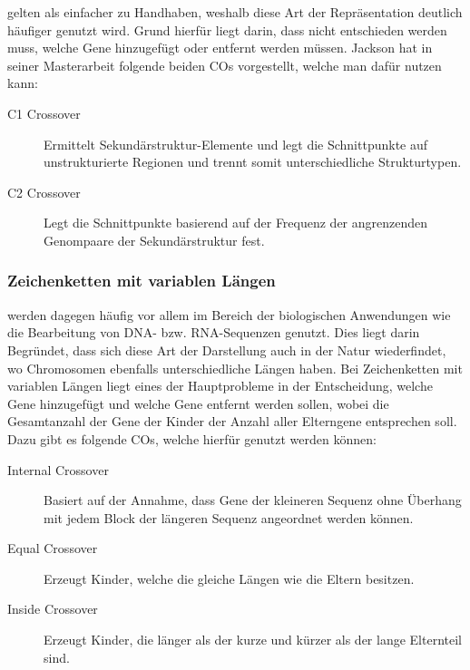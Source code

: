 		gelten als einfacher zu Handhaben, weshalb diese Art der Repräsentation deutlich häufiger genutzt wird. Grund hierfür liegt darin, dass nicht entschieden werden muss, welche Gene hinzugefügt oder entfernt werden müssen. Jackson hat in seiner Masterarbeit \cite{COProteins} folgende beiden COs vorgestellt, welche man dafür nutzen kann:
		
		\begin{description}
			\item[C1 Crossover] Ermittelt Sekundärstruktur-Elemente und legt die Schnittpunkte auf unstrukturierte Regionen und trennt somit unterschiedliche Strukturtypen.
			\item[C2 Crossover] Legt die Schnittpunkte basierend auf der Frequenz der angrenzenden Genompaare der Sekundärstruktur fest.
		\end{description}
	
	\subsubsection{Zeichenketten mit variablen Längen}
	
		werden dagegen häufig vor allem im Bereich der biologischen Anwendungen wie die Bearbeitung von DNA- bzw. RNA-Sequenzen genutzt. Dies liegt darin Begründet, dass sich diese Art der Darstellung auch in der Natur wiederfindet, wo Chromosomen ebenfalls unterschiedliche Längen haben. Bei Zeichenketten mit variablen Längen liegt eines der Hauptprobleme in der Entscheidung, welche Gene hinzugefügt und welche Gene entfernt werden sollen, wobei die Gesamtanzahl der Gene der Kinder der Anzahl aller Elterngene entsprechen soll. Dazu gibt es \zB folgende COs, welche hierfür genutzt werden können:
		
		\begin{description}
			\item[Internal Crossover] Basiert auf der Annahme, dass Gene der kleineren Sequenz ohne Überhang mit jedem Block der längeren Sequenz angeordnet werden können. \cite{UnequalCO}
			\item[Equal Crossover] Erzeugt Kinder, welche die gleiche Längen wie die Eltern besitzen. \cite{UnqeualLengthCO}
			\item[Inside Crossover] Erzeugt Kinder, die länger als der kurze und kürzer als der lange Elternteil sind. \cite{UnqeualLengthCO}
		\end{description}